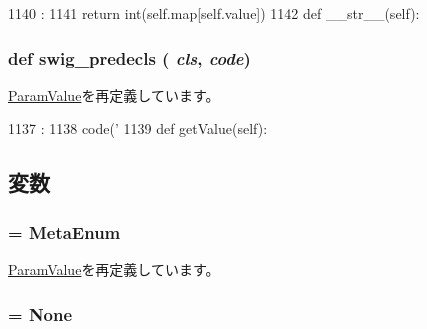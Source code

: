 \begin{DoxyCode}
1140                       :
1141         return int(self.map[self.value])
1142 
    def __str__(self):
\end{DoxyCode}
\hypertarget{classm5_1_1params_1_1Enum_ab3dbcf5716623eac67a8ccc074fa7e13}{
\subsubsection[{swig\_\-predecls}]{\setlength{\rightskip}{0pt plus 5cm}def swig\_\-predecls ( {\em cls}, \/   {\em code})}}
\label{classm5_1_1params_1_1Enum_ab3dbcf5716623eac67a8ccc074fa7e13}


\hyperlink{classm5_1_1params_1_1ParamValue_ab3dbcf5716623eac67a8ccc074fa7e13}{ParamValue}を再定義しています。


\begin{DoxyCode}
1137                                 :
1138         code('%
1139 
    def getValue(self):
\end{DoxyCode}


\subsection{変数}
\hypertarget{classm5_1_1params_1_1Enum_adfc4d1824f4ecdcbb04ceafc5bbc933e}{
\subsubsection[{\_\-\_\-metaclass\_\-\_\-}]{ = {\bf MetaEnum}}}
\label{classm5_1_1params_1_1Enum_adfc4d1824f4ecdcbb04ceafc5bbc933e}


\hyperlink{classm5_1_1params_1_1ParamValue_adfc4d1824f4ecdcbb04ceafc5bbc933e}{ParamValue}を再定義しています。\hypertarget{classm5_1_1params_1_1Enum_a8c2dc4d96bdbbac20face743a1c0f909}{
\subsubsection[{enum\_\-name}]{ = None}}
\label{classm5_1_1params_1_1Enum_a8c2dc4d96bdbbac20face743a1c0f909}



